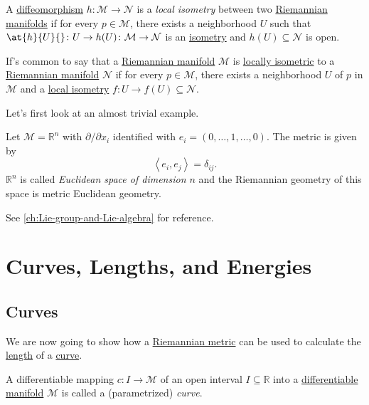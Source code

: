 \begin{definition}\label{def:local-isometry}
	A \hyperref[def:diffeomorphism]{diffeomorphism} \(h\colon \mathcal{M} \to \mathcal{N} \) is a \emph{local isometry} between two \hyperref[def:Riemannian-manifold]{Riemannian manifolds} if for every \(p\in \mathcal{M} \), there exists a neighborhood \(U\) such that \(\at{h}{U}{} \colon U \to  h(U)\colon \mathcal{M} \to \mathcal{N} \) is an \hyperref[def:isometry]{isometry} and \(h(U) \subseteq \mathcal{N} \) is open.
\end{definition}

If's common to say that a \hyperref[def:Riemannian-manifold]{Riemannian manifold} \(\mathcal{M} \) is \hyperref[def:local-isometry]{locally isometric} to a \hyperref[def:Riemannian-manifold]{Riemannian manifold} \(\mathcal{N} \) if for every \(p\in \mathcal{M} \), there exists a neighborhood \(U\) of \(p\) in \(\mathcal{M} \) and a \hyperref[def:local-isometry]{local isometry} \(f\colon U \to f(U) \subseteq \mathcal{N} \).

Let's first look at an almost trivial example.

\begin{eg}
	Let \(\mathcal{M} = \mathbb{R} ^n\) with \(\partial /\partial x_i\) identified with \(e_i =(0, \ldots , 1, \ldots , 0)\). The metric is given by
	\[
		\left\langle e_i, e_j \right\rangle = \delta _{ij}.
	\]
	\(\mathbb{R} ^n\) is called \emph{Euclidean space of dimension \(n\)} and the Riemannian geometry of this space is metric Euclidean geometry.
\end{eg}

\begin{eg}
	See \autoref{ch:Lie-group-and-Lie-algebra} for reference.
\end{eg}

\section{Curves, Lengths, and Energies}
\subsection{Curves}
We are now going to show how a \hyperref[def:Riemannian-metric]{Riemannian metric} can be used to calculate the \hyperref[def:length]{length} of a \hyperref[def:curve]{curve}.

\begin{definition}[Curve]\label{def:curve}
	A differentiable mapping \(c\colon I \to \mathcal{M} \) of an open interval \(I \subseteq \mathbb{R} \) into a \hyperref[def:smooth-manifold]{differentiable manifold} \(\mathcal{M} \) is called a (parametrized) \emph{curve}.
\end{definition}

